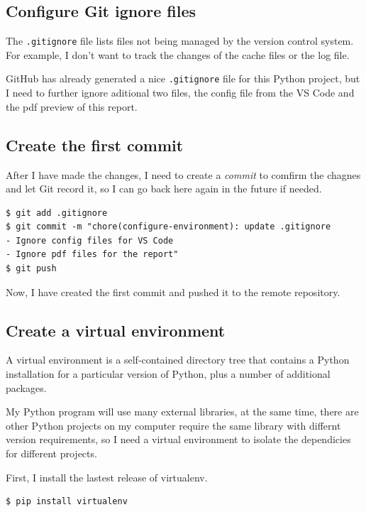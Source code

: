 \documentclass[a4paper]{report}
\begin{document}
\subsection{Configure Git ignore files}

The \texttt{.gitignore} file lists files not being managed by the version control system. For example, I don't want to track the changes of the cache files or the log file.

GitHub has already generated a nice \texttt{.gitignore} file for this Python project, but I need to further ignore aditional two files, the config file from the VS Code and the pdf preview of this report.

\subsection{Create the first commit}

After I have made the changes, I need to create a \emph{commit} to comfirm the chagnes and let Git record it, so I can go back here again in the future if needed.

\begin{verbatim}
$ git add .gitignore
$ git commit -m "chore(configure-environment): update .gitignore
- Ignore config files for VS Code
- Ignore pdf files for the report"
$ git push
\end{verbatim}

Now, I have created the first commit and pushed it to the remote repository.

\subsection{Create a virtual environment}

A virtual environment is a self-contained directory tree that contains a Python installation for a particular version of Python, plus a number of additional packages.

My Python program will use many external libraries, at the same time, there are other Python projects on my computer require the same library with differnt version requirements, so I need a virtual environment to isolate the dependicies for different projects.

First, I install the lastest release of virtualenv.

\begin{verbatim}
$ pip install virtualenv
\end{verbatim}
\end{document}
